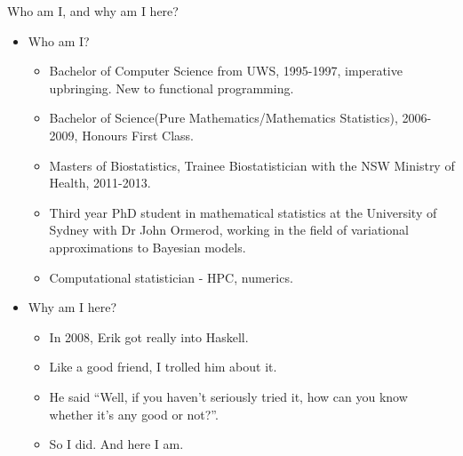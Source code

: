 \documentclass{beamer}
\begin{document}
\begin{frame}{Who am I, and why am I here?}
\begin{itemize}
\item Who am I?
\begin{itemize}
\item Bachelor of Computer Science from UWS, 1995-1997, imperative upbringing. New to functional programming.
\item Bachelor of Science(Pure Mathematics/Mathematics Statistics), 2006-2009, Honours First Class.
\item Masters of Biostatistics, Trainee Biostatistician with the NSW Ministry of Health, 2011-2013.
\item Third year PhD student in mathematical statistics at the University of Sydney with Dr John Ormerod, 
			working in the field of variational approximations to Bayesian models.
\item Computational statistician - HPC, numerics.
\end{itemize}

\item Why am I here?
\begin{itemize}
\item In 2008, Erik got really into Haskell.\\
\item Like a good friend, I trolled him about it.\\
\item He said ``Well, if you haven't seriously tried it, how can you know whether it's
			any good or not?''.\\
\item So I did. And here I am.
\end{itemize}
\end{itemize}
\end{frame}
\end{document}

